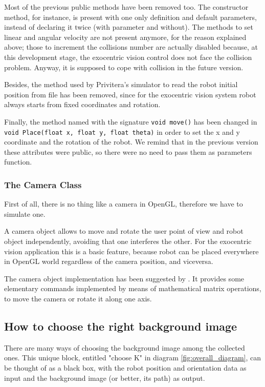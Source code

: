 %
Most of the previous public methods have been removed too. 
The constructor method, for instance, is present with one
only definition and default parameters, instead of declaring 
it twice (with parameter and without). The methods to set
linear and angular velocity are not present anymore, for 
the reason explained above; those to increment the collisions 
number are actually disabled because, at this development 
stage, the exocentric vision control does not face the collision 
problem. Anyway, it is supposed to cope with collision in 
the future version.
%

%
Besides, the method used by Privitera's simulator to read 
the robot initial position from file has been removed, since 
for the exocentric vision system robot always starts from 
fixed coordinates and rotation.
%

%
Finally, the method named with the signature 
\texttt{void move()} has been changed in \texttt{void Place(float x, float y, float theta)}
in order to set the x and y coordinate and the rotation of the robot. 
We remind that in the previous version these attributes
were public, so there were no need to pass them as parameters function.

\subsubsection{The Camera Class}
\label{sub:cameraclass}


First of all, there is no thing like a camera in OpenGL, therefore we have to
simulate one.
%

%
A camera object allows to move and rotate the user point of view and robot
object independently, avoiding that one interferes the other. For the exocentric
vision application this is a basic feature, because robot can be placed
everywhere in OpenGL world regardless of the camera position, and viceversa.
%

%
The camera object implementation has been suggested by \cite{opengl:camera}.
It provides some elementary commands implemented by means of mathematical matrix
operations, to move the camera or rotate it along one axis.

\subsection{How to choose the right background image}
\label{sub:howbackgroundimage}

There are many ways of choosing the background image among the collected ones. This unique
block, entitled "choose K" in diagram \ref{fig:overall_diagram}, can be thought of as a
black box, with the robot position and orientation data as input and the background image
(or better, its path) as output.
%

